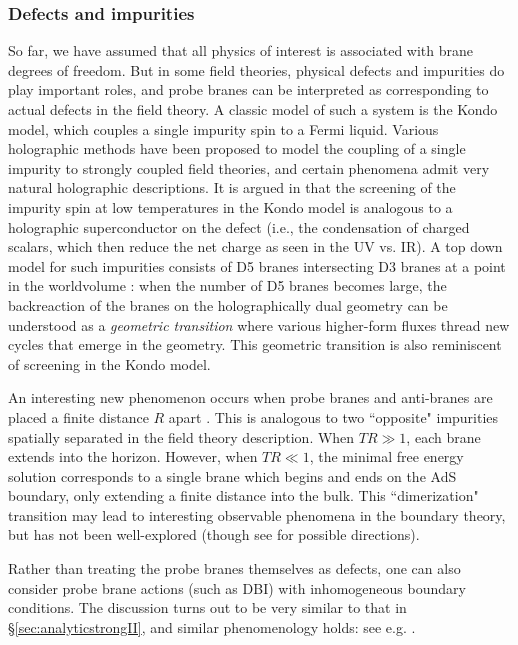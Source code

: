 \documentclass[10pt, oneside]{book}
\begin{document}
\begin{doublespace}
\subsubsection{Defects and impurities}
So far, we have assumed that all physics of interest is associated with brane degrees of freedom.    But in some field theories, physical defects and impurities do play important roles, and probe branes can be interpreted as corresponding to actual defects in the field theory.   A classic model of such a system is the Kondo model, which couples a single impurity spin to a Fermi liquid.   Various holographic methods have been proposed to model the coupling of a single impurity to strongly coupled field theories, and certain phenomena admit very natural holographic descriptions.   It is argued in \cite{Erdmenger:2013dpa} that the screening of the impurity spin at low temperatures in the Kondo model is analogous to a holographic superconductor on the defect (i.e., the condensation of charged scalars, which then reduce the net charge as seen in the UV vs. IR).    A top down model for such impurities consists of D5 branes intersecting D3 branes at a point in the worldvolume \cite{Harrison:2011fs}:  when the number of D5 branes becomes large,  the backreaction of the branes on the holographically dual geometry can be understood as a \emph{geometric transition} \cite{Lin:2004nb, D'Hoker:2007fq} where various higher-form fluxes thread new cycles that emerge in the geometry.   This geometric transition is also reminiscent of screening in the Kondo model.


An interesting new phenomenon occurs when probe branes and anti-branes are placed a finite distance $R$ apart \cite{Kachru:2009xf}.   This is analogous to two ``opposite" impurities spatially separated in the field theory description.  When $TR\gg 1$,  each brane extends into the horizon.   However, when $TR \ll 1$, the minimal free energy solution corresponds to a single brane which begins and ends on the AdS boundary, only extending a finite distance into the bulk.   This ``dimerization" transition may lead to interesting observable phenomena in the boundary theory, but has not been well-explored (though see \cite{Kachru:2009xf, Kachru:2010dk} for possible directions).

Rather than treating the probe branes themselves as defects, one can also consider probe brane actions (such as DBI) with inhomogeneous boundary conditions.  The discussion turns out to be very similar to that in \S\ref{sec:analyticstrongII}, and similar phenomenology holds: see e.g. \cite{Ryu:2011vq, Ikeda:2016rqh}.


\end{doublespace}
\end{document}
